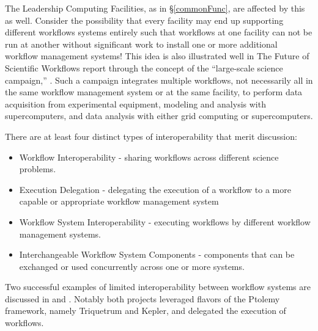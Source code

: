 The Leadership Computing Facilities, as in \S\ref{commonFunc}, are affected by
this as well. Consider the possibility that every facility may end up supporting
different workflows systems entirely such that workflows at one facility can not
be run at another without significant work to install one or more additional
workflow management systems! This idea is also illustrated well in The Future of
Scientific Workflows report through the concept of the ``large-scale science
campaign,'' \cite{deelman_future_2015}. Such a campaign integrates multiple
workflows, not necessarily all in the same workflow management system or at the
same facility, to perform data acquisition from experimental equipment, modeling
and analysis with supercomputers, and data analysis with either grid computing
or supercomputers.

There are at least four distinct types of interoperability that merit
discussion: \begin{itemize} \item Workflow Interoperability - sharing workflows
across different science problems.  \item Execution Delegation - delegating the
execution of a workflow to a more capable or appropriate workflow management
system \item Workflow System Interoperability - executing workflows by different
workflow management systems.  \item Interchangeable Workflow System Components -
components that can be exchanged or used concurrently across one or more
systems.  \end{itemize} Two successful examples of limited interoperability
between workflow systems are discussed in \cite{brooks_triquetrum:_2015} and
\cite{mandal_integrating_2007}. Notably both projects leveraged flavors of the
Ptolemy framework, namely Triquetrum and Kepler, and delegated the execution of
workflows.
